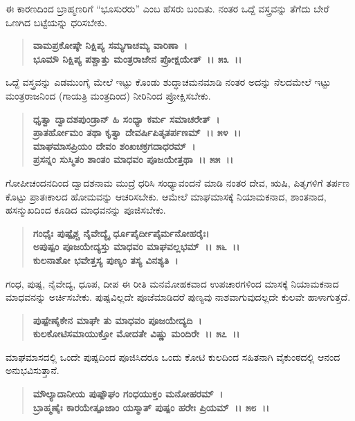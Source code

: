 ಈ ಕಾರಣದಿಂದ ಬ್ರಾಹ್ಮಣರಿಗೆ “ಭೂಸುರರು” ಎಂಬ ಹೆಸರು ಬಂದಿತು. ನಂತರ ಒದ್ದೆ ವಸ್ತ್ರವನ್ನು ತೆಗೆದು ಬೇರೆ ಒಣಗಿದ ಬಟ್ಟೆಯನ್ನು ಧರಿಸಬೇಕು.

\begin{verse}
\textbf{ವಾಮಪ್ರಕೋಷ್ಠೇ ನಿಕ್ಷಿಪ್ಯ ಸಮ್ಯಗಾಚಮ್ಯ ವಾರಿಣಾ~।}\\\textbf{ಭೂಮೌ ನಿಕ್ಷಿಪ್ಯ ಪಶ್ಚಾತ್ತು ಮಂತ್ರರಾಜೇನ ಪ್ರೋಕ್ಷಯೇತ್~।। ೫೩~।।}
\end{verse}

ಒದ್ದೆ ವಸ್ತ್ರವನ್ನು ಎಡಮುಂಗೈ ಮೇಲೆ ಇಟ್ಟು ಕೊಂಡು ಶುದ್ಧಾಚಮನಮಾಡಿ ನಂತರ ಅದನ್ನು ನೆಲದಮೇಲೆ ಇಟ್ಟು ಮಂತ್ರರಾಜನಿಂದ (ಗಾಯತ್ರಿ ಮಂತ್ರದಿಂದ) ನೀರಿನಿಂದ ಪ್ರೋಕ್ಷಿಸಬೇಕು.

\begin{verse}
\textbf{ಧೃತ್ವಾ ದ್ವಾದಶಪುಂಡ್ರಾನ್ ಹಿ ಸಂಧ್ಯಾ ಕರ್ಮ ಸಮಾಚರೇತ್~।}\\\textbf{ಪ್ರಾತರ್ಹೋಮಂ ತಥಾ ಕೃತ್ವಾ ದೇವರ್ಷಿಪಿತೃತರ್ಪಣಮ್~।। ೫೪~।।}\\\textbf{ಮಾಘಮಾಸಪ್ರಿಯಂ ದೇವಂ ಶಂಖಚಕ್ರಗದಾಧರಮ್~।\\ ಪ್ರಸನ್ನಂ ಸುಸ್ಮಿತಂ ಶಾಂತಂ ಮಾಧವಂ ಪೂಜಯೇತ್ತಥಾ~।। ೫೫~।।}
\end{verse}

ಗೋಪೀಚಂದನದಿಂದ ದ್ವಾದಶನಾಮ ಮುದ್ರೆ ಧರಿಸಿ ಸಂಧ್ಯಾವಂದನೆ ಮಾಡಿ ನಂತರ ದೇವ, ಋಷಿ, ಪಿತೃಗಳಿಗೆ ತರ್ಪಣ ಕೊಟ್ಟು ಪ್ರಾತಃಕಾಲದ ಹೋಮವನ್ನು ಆಚರಿಸಬೇಕು. ಆಮೇಲೆ ಮಾಘಮಾಸಕ್ಕೆ ನಿಯಾಮಕನಾದ, ಶಾಂತನಾದ, ಹಸನ್ಮುಖದಿಂದ ಕೂಡಿದ ಮಾಧವನನ್ನು ಪೂಜಿಸಬೇಕು.

\begin{verse}
\textbf{ಗಂಧೈಃ ಪುಷ್ಪೈಶ್ಚ ನೈವೇದ್ಯೈ ರ್ಧೂಪೈರ್ದೀಪೈರ್ಮನೋಹರೈಃ।}\\\textbf{ಅಪುಷ್ಪಂ ಪೂಜಯೇದ್ಯಸ್ತು ಮಾಧವಂ ಮಾಘವಲ್ಲಭಮ್~।। ೫೬~।।}\\\textbf{ಕುಲನಾಶೋ ಭವೇತ್ತಸ್ಯ ಪುಣ್ಯಂ ತಸ್ಯ ವಿನಶ್ಯತಿ~।}
\end{verse}

ಗಂಧ, ಪುಷ್ಪ, ನೈವೇದ್ಯ, ಧೂಪ, ದೀಪ ಈ ರೀತಿ ಮನಮೋಹಕವಾದ ಉಪಚಾರಗಳಿಂದ ಮಾಸಕ್ಕೆ ನಿಯಾಮಕನಾದ ಮಾಧವನನ್ನು ಅರ್ಚಿಸಬೇಕು. ಪುಷ್ಪವಿಲ್ಲದೇ ಪೂಜೆಮಾಡಿದರೆ ಪುಣ್ಯವು ನಾಶವಾಗುವುದಲ್ಲದೇ ಕುಲವೇ ಹಾಳಾಗುತ್ತದೆ.

\begin{verse}
\textbf{ಪುಷ್ಪೇಣೈಕೇನ ಮಾಘೇ ತು ಮಾಧವಂ ಪೂಜಯೇದ್ಯದಿ~।}\\\textbf{ಕುಲಕೋಟಿಸಮಾಯುಕ್ತೋ ಮೋದತೇ ವಿಷ್ಣು ಮಂದಿರೇ~।। ೫೭~।।}
\end{verse}

ಮಾಘಮಾಸದಲ್ಲಿ ಒಂದೇ ಪುಷ್ಪದಿಂದ ಪೂಜಿಸಿದರೂ ಒಂದು ಕೋಟಿ ಕುಲದಿಂದ ಸಹಿತನಾಗಿ ವೈಕುಂಠದಲ್ಲಿ ಆನಂದ ಅನುಭವಿಸುತ್ತಾನೆ.

\begin{verse}
\textbf{ಮೌಲ್ಯಾದಾನೀಯ ಪುಷ್ಪೌಘಂ ಗಂಧಯುಕ್ತಂ ಮನೋಹರಮ್~।}\\\textbf{ಬ್ರಾಹ್ಮಣೈಃ ಕಾರಯೇತ್ಪೂಜಾಂ ಯಸ್ಮಾತ್ ಪುಷ್ಪಂ ಹರೇಃ ಪ್ರಿಯಮ್~।। ೫೮~।।}
\end{verse}

